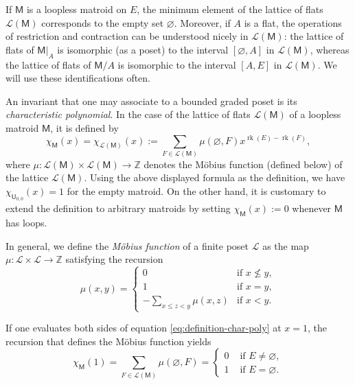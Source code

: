 \documentclass[11pt, a4paper, english]{amsart}
\theoremstyle{teoremas}
\theoremstyle{definition}
\DeclareMathOperator{\rk}{rk}
\newcommand{\M}{\mathsf{M}}
\newcommand{\U}{\mathsf{U}}
\begin{document}
If $\M$ is a loopless matroid on $E$, the minimum element of the lattice of flats $\mathcal{L}(\M)$ corresponds to the empty set $\varnothing$. Moreover, if $A$ is a flat, the operations of restriction and contraction can be understood nicely in $\mathcal{L}(\M)$: the lattice of flats of $\M|_A$ is isomorphic (as a poset) to the interval $[\varnothing,A]$ in $\mathcal{L}(\M)$, whereas the lattice of flats of $\M/A$ is isomorphic to the interval $[A,E]$ in $\mathcal{L}(\M)$. We will use these identifications  often.


An invariant that one may associate to a bounded graded poset is its \emph{characteristic polynomial}. In the case of the lattice of flats $\mathcal{L}(\M)$ of a loopless matroid $\M$, it is defined by 
    \begin{equation}\label{eq:definition-char-poly}
        \chi_{\M}(x)=\chi_{\mathcal{L}(\M)}(x) := \sum_{F\in \mathcal{L}(\M)} \mu(\varnothing, F) x^{\rk(E)-\rk(F)},
    \end{equation}
where $\mu\colon\mathcal{L}(\M)\times\mathcal{L}(\M)\to \mathbb{Z}$ denotes the M\"obius function (defined below) of the lattice $\mathcal{L}(\M)$. Using the above displayed formula as the definition, we have $\chi_{\U_{0,0}}(x)=1$ for the empty matroid. On the other hand, it is customary to extend the definition to arbitrary matroids by setting $\chi_{\M}(x):=0$ whenever $\M$ has loops.

In general, we define the \emph{M\"obius function} of a finite poset $\mathcal{L}$ as the map $\mu\colon\mathcal{L}\times\mathcal{L}\to \mathbb{Z}$ satisfying the recursion
    \begin{equation} \label{eq:mobius}
    \mu(x, y) = 
    \begin{cases}
        0 & \text{if }x\not\leq y,\\
        1 & \text{if }x = y,\\
        -\displaystyle\sum_{x\leq z < y} \mu(x, z) & \text{if }x < y. \end{cases}\end{equation}

If one evaluates both sides of equation \eqref{eq:definition-char-poly} at $x=1$, the recursion that defines the M\"obius function yields
\[ \chi_{\M}(1) = \sum_{F\in\mathcal{L}(\M)} \mu(\varnothing, F) = \begin{cases} 0 & \text{ if } E\neq \varnothing,\\ 1 & \text{ if } E=\varnothing.
\end{cases}\]
\end{document}
